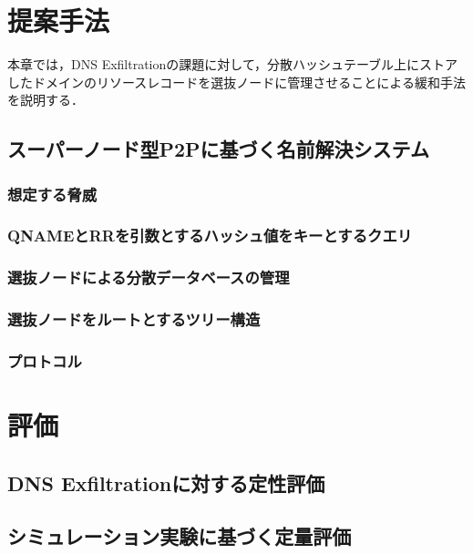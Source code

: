 \documentclass[12pt]{jarticle} %
\begin{document}
\newpage
\section{提案手法}
本章では，DNS Exfiltrationの課題に対して，分散ハッシュテーブル上にストアしたドメインのリソースレコードを選抜ノードに管理させることによる緩和手法を説明する．
\subsection{スーパーノード型P2Pに基づく名前解決システム}
\subsubsection{想定する脅威}
\subsubsection{QNAMEとRRを引数とするハッシュ値をキーとするクエリ}
\subsubsection{選抜ノードによる分散データベースの管理}
\subsubsection{選抜ノードをルートとするツリー構造}
\subsubsection{プロトコル}


\newpage
\section{評価}
\subsection{DNS Exfiltrationに対する定性評価}
\subsection{シミュレーション実験に基づく定量評価}
\end{document}
